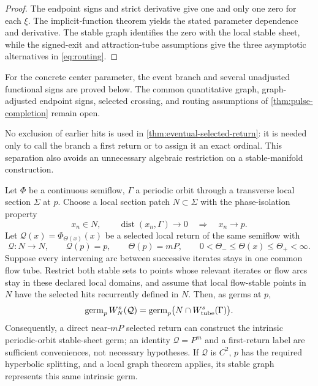 \begin{proof}
The endpoint signs and strict derivative give one and only one zero for each
\(\xi\).  The implicit-function theorem yields the stated parameter
dependence and derivative.  The stable graph identifies the zero with the
local stable sheet, while the signed-exit and attraction-tube assumptions give
the three asymptotic alternatives in \cref{eq:routing}.
\end{proof}

For the concrete center parameter, the event branch and several unadjusted
functional signs are proved below.  The common quantitative graph,
graph-adjusted endpoint signs, selected crossing, and routing assumptions of
\cref{thm:pulse-completion} remain open.

No exclusion of earlier hits is used in
\cref{thm:eventual-selected-return}: it is needed only to call the branch a
first return or to assign it an exact ordinal.  This separation also avoids
an unnecessary algebraic restriction on a stable-manifold construction.

\begin{lemma}
\label{lem:direct-selected-stable-germ}
Let \(\Phi\) be a continuous semiflow, \(\Gamma\) a periodic orbit through a
transverse local section \(\Sigma\) at \(p\).  Choose a local section patch
\(N\subset\Sigma\) with the phase-isolation property
\begin{equation}
 x_n\in N,\qquad \operatorname{dist}(x_n,\Gamma)\to0
 \quad\Longrightarrow\quad x_n\to p.                 \label{eq:section-phase-isolation}
\end{equation}
Let \(\mathcal Q(x)=\Phi_{\Theta(x)}(x)\) be a selected local return of the
same semiflow with
\[
 \mathcal Q\colon N\to N,\qquad \mathcal Q(p)=p,\qquad
 \Theta(p)=mP,\qquad
 0<\Theta_-\le\Theta(x)\le\Theta_+<\infty.
\]
Suppose every intervening arc between successive iterates stays in one common
flow tube.  Restrict both stable sets to points whose relevant iterates or
flow arcs stay in these declared local domains, and assume that local
flow-stable points in \(N\) have the selected hits recurrently defined in
\(N\).  Then, as germs at \(p\),
\begin{equation}
 \operatorname{germ}_p W^s_N(\mathcal Q)
 =\operatorname{germ}_p\bigl(N\cap W^s_{\rm tube}(\Gamma)\bigr).
                                                               \label{eq:direct-return-stable-germ}
\end{equation}
Consequently, a direct near-\(mP\) selected return can construct the intrinsic
periodic-orbit stable-sheet germ; an identity \(\mathcal Q=P^m\) and a
first-return label are sufficient conveniences, not necessary hypotheses.
If \(\mathcal Q\) is \(C^2\), \(p\) has the required hyperbolic splitting,
and a local graph theorem applies, its stable graph represents this same
intrinsic germ.
\end{lemma}

